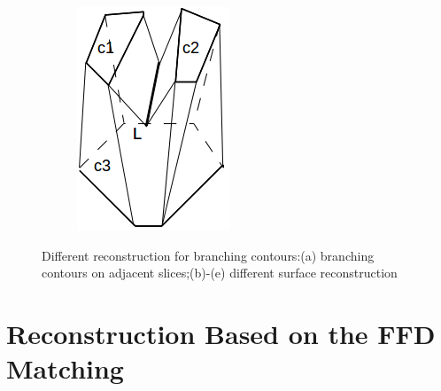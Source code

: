 \documentclass[3p,times]{elsarticle}
\begin{document}
\begin{figure}[ht]
\begin{subfigure}[b]{0.1\textwidth}
\includegraphics[width=\textwidth]{../picture/branch-middle.png}
\caption{}
\label{fig:branch-middle}
\end{subfigure}


\caption{Different reconstruction for branching contours:(a) branching
contours on adjacent slices;(b)-(e) different surface reconstruction}
\label{fig:branches}
\end{figure}




\section{Reconstruction Based on the FFD Matching}
\label{section3}
\end{document}
